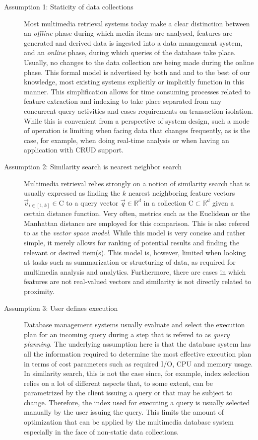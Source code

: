 \begin{description}
    \item[Assumption 1: Staticity of data collections] Most multimedia retrieval systems today make a clear distinction between an \emph{offline} phase during which media items are analysed, features are generated and derived data is ingested into a data management system, and an \emph{online} phase, during which queries of the database take place. Usually, no changes to the data collection are being made during the online phase. This formal model is advertised by both \cite{Giangreco:2018thesis} and \cite{Rossetto:2018thesis} and to the best of our knowledge, most existing systems explicitly or implicitly function in this manner. This simplification allows for time consuming processes related to feature extraction and indexing to take place separated from any concurrent query activities and eases requirements on transaction isolation. While this is convenient from a perspective of system design, such a mode of operation is limiting when facing data that changes frequently, as is the case, for example, when doing real-time analysis or when having an application with CRUD support.
   
    \item[Assumption 2: Similarity search is nearest neighbor search] Multimedia retrieval relies strongly on a notion of similarity search that is usually expressed as finding the $k$ nearest neighboring feature vectors $\vec{v}_{i \in \left[1,k\right]} \in \mathrm{C}$ to a query vector $\vec{q} \in \mathbb{R}^d$ in a collection $\mathrm{C} \subset \mathbb{R}^d$ given a certain distance function. Very often, metrics such as the Euclidean or the Manhattan distance are employed for this comparison. This is also refered to as the \emph{vector space model}. While this model is very concise and rather simple, it merely allows for ranking of potential results and finding the relevant or desired item(s). This model is, however, limited when looking at tasks such as summarization or structuring of data, as required for multimedia analysis and analytics. Furthermore, there are cases in which features are not real-valued vectors and similarity is not directly related to proximity.

    \item[Assumption 3: User defines execution] Database management systems usually evaluate and select the execution plan for an incoming query during a step that is refered to as \emph{query planning}. The underlying assumption here is that the database system has all the information required to determine the most effective execution plan in terms of cost parameters such as required I/O, CPU and memory usage. In similarity search, this is not the case since, for example, index selection relies on a lot of different aspects that, to some extent, can be parametrized by the client issuing a query or that may be subject to change. Therefore, the index used for executing a query is usually selected manually by the user issuing the query. This limits the amount of optimization that can be applied by the multimedia database system especially in the face of non-static data collections.
\end{description}



